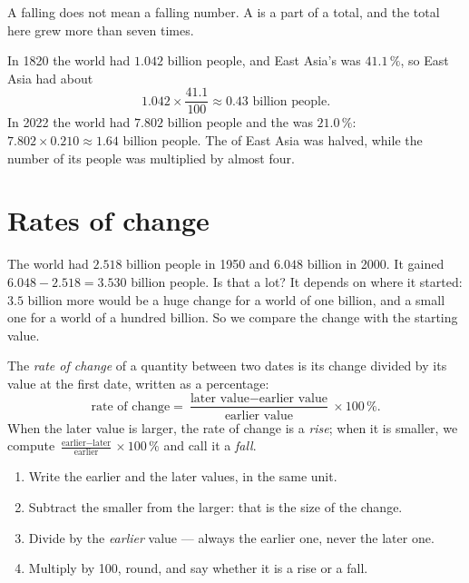 A falling  does not mean a falling number. A  is a part of a total,
and the total here grew more than seven times.

\begin{example}\label{ex:g6:reading-economic-charts:east-asia}
In 1820 the world had $1.042$ billion people, and East Asia's  was
$41.1\,\%$, so East Asia had about
\[
  1.042 \times \frac{41.1}{100} \approx 0.43 \text{ billion people.}
\]
In 2022 the world had $7.802$ billion people and the  was $21.0\,\%$:
$7.802 \times 0.210 \approx 1.64$ billion people. The  of East Asia was
halved, while the number of its people was multiplied by almost four.
\end{example}

\section{Rates of change}\label{sec:g6:reading-economic-charts:rates}

The world had $2.518$ billion people in 1950 and $6.048$ billion in 2000.
It gained $6.048 - 2.518 = 3.530$ billion people. Is that a lot? It depends on
where it started: $3.5$ billion more would be a huge change for a world of one
billion, and a small one for a world of a hundred billion. So we compare the
change with the starting value.

\begin{definition}\label{def:g6:reading-economic-charts:rate-of-change}
The \emph{rate of change} of a quantity between two
dates is its change divided by its value at the first date, written as a
percentage:
\[
  \text{rate of change}
  = \frac{\text{later value} - \text{earlier value}}{\text{earlier value}}
    \times 100\,\%.
\]
When the later value is larger, the rate of change is a \emph{rise}; when it
is smaller, we compute $\frac{\text{earlier} - \text{later}}{\text{earlier}}
\times 100\,\%$ and call it a \emph{fall}.
\end{definition}

\begin{method}\label{met:g6:reading-economic-charts:rate}
\begin{enumerate}
  \item Write the earlier and the later values, in the same unit.
  \item Subtract the smaller from the larger: that is the size of the change.
  \item Divide by the \emph{earlier} value --- always the earlier one, never
        the later one.
  \item Multiply by 100, round, and say whether it is a rise or a fall.
\end{enumerate}
\end{method}

